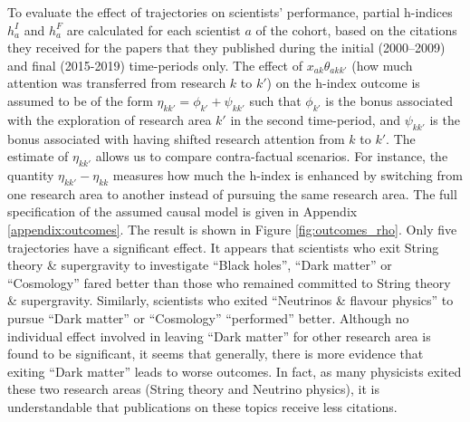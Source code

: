\documentclass{article}
\begin{document}
To evaluate the effect of trajectories on scientists' performance, partial h-indices $h_a^{I}$ and $h_a^{F}$ are calculated for each scientist $a$ of the cohort, based on the citations they received for the papers that they published during the initial (2000--2009) and final (2015-2019) time-periods only. The effect of $x_{ak}\theta_{akk'}$ (how much attention was transferred from research $k$ to $k'$) on the h-index outcome is assumed to be of the form $\eta_{kk'} = \phi_{k'} + \psi_{kk'}$ such that $\phi_{k'}$ is the bonus associated with the exploration of research area $k'$ in the second time-period, and $\psi_{kk'}$ is the bonus associated with having shifted research attention from $k$ to $k'$. The estimate of $\eta_{kk'}$ allows us to compare contra-factual scenarios. For instance, the quantity $\eta_{kk'}-\eta_{kk}$ measures how much the h-index is enhanced by switching from one research area to another instead of pursuing the same research area. The full specification of the assumed causal model is given in Appendix \ref{appendix:outcomes}. The result is shown in Figure \ref{fig:outcomes_rho}. Only five trajectories have a significant effect. It appears that scientists who exit String theory \& supergravity to investigate ``Black holes'', ``Dark matter'' or ``Cosmology'' fared better than those who remained committed to String theory \& supergravity. Similarly, scientists who exited ``Neutrinos \& flavour physics'' to pursue ``Dark matter'' or ``Cosmology'' ``performed'' better. Although no individual effect involved in leaving ``Dark matter'' for other research area is found to be significant, it seems that generally, there is more evidence that exiting ``Dark matter'' leads to worse outcomes. In fact, as many physicists exited these two research areas (String theory and Neutrino physics), it is understandable that publications on these topics receive less citations. 
\end{document}
